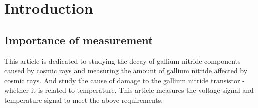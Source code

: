 \chapter{Introduction}
\label{chap:Introduction}
 
\section{Importance of measurement}
\label{Importance of measurement}
This article is dedicated to studying the decay of gallium nitride components caused by cosmic rays and measuring the amount of gallium nitride affected by cosmic rays. And study the cause of damage to the gallium nitride transistor - whether it is related to temperature. This article measures the voltage signal and temperature signal to meet the above requirements.

